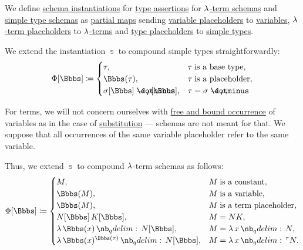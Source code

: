 \begin{definition}\label{def:lambda_schema_instantiation}
  We define \hyperref[con:schemas_and_instances]{schema instantiations} for \hyperref[def:type_assertion]{type assertions} for \hyperref[def:lambda_term_schema]{\( \mathrm{\lambda} \)-term schemas} and \hyperref[def:simple_type_schema]{simple type schemas} as \hyperref[def:set_valued_map/partial]{partial maps} sending \hyperref[def:lambda_term_schema]{variable placeholders} to \hyperref[def:lambda_term]{variables}, \hyperref[def:lambda_term_schema]{\( \mathrm{\lambda} \)-term placeholders} to \hyperref[def:lambda_term]{\( \mathrm{\lambda} \)-terms} and \hyperref[def:simple_type_schema]{type placeholders} to \hyperref[def:simple_type]{simple types}.

  \begin{thmenum}
     We extend the instantiation \( \Bbbs \) to compound simple types straightforwardly:
    \begin{equation}\label{eq:def:lambda_schema_instantiation/types}
      \Phi[\Bbbs] \coloneqq \begin{cases}
        \tau,                                  &\tau \T{is a base type},   \\
        \Bbbs(\tau),                           &\tau \T{is a placeholder}, \\
        \sigma[\Bbbs] \synimplies \rho[\Bbbs], &\tau = \sigma \synimplies \rho,  \\
      \end{cases}
    \end{equation}

     For terms, we will not concern ourselves with \hyperref[def:lambda_variable_occurrence]{free and bound occurrence} of variables as in the case of \hyperref[def:lambda_term_schema_substitution]{substitution} --- schemas are not meant for that. We suppose that all occurrences of the same variable placeholder refer to the same variable.

    Thus, we extend \( \Bbbs \) to compound \( \mathrm{\lambda} \)-term schemas as follows:
    \begin{equation}\label{eq:def:lambda_schema_instantiation/terms}
      \Phi[\Bbbs] \coloneqq \begin{cases}
        M,                                       &M \T{is a constant},         \\
        \Bbbs(M),                                &M \T{is a variable},         \\
        \Bbbs(M),                                &M \T{is a term placeholder}, \\
        N[\Bbbs] \thinspace K[\Bbbs],            &M = NK,                      \\
        \qabs {\Bbbs(x)} N[\Bbbs],               &M = \qabs x N,               \\
        \qabs {\Bbbs(x)^{\Bbbs(\tau)}} N[\Bbbs], &M = \qabs x^\tau N.        \\
      \end{cases}
    \end{equation}


\end{thmenum}
\end{definition}
